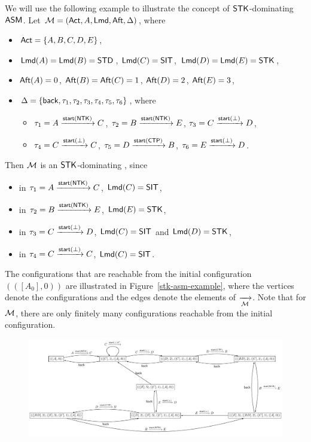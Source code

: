 \begin{example}
We will use the following example to illustrate the concept of $\mathsf{STK}$-dominating $\textsf{ASM}$.
Let ${\mathcal{M} }=({\sf Act},A,{\sf Lmd},{\sf Aft},\Delta)$, where 
\begin{itemize}
\item ${\sf Act} = \{A, B, C, D, E\}$, 
%
\item ${\sf Lmd}(A)={\sf Lmd}(B)={\sf STD}$, ${\sf Lmd}(C) = {\sf SIT}$, ${\sf Lmd}(D) = {\sf Lmd}(E) = {\sf STK}$, 
%
\item ${\sf Aft}(A) = 0$, ${\sf Aft}(B) = {\sf Aft}(C) = 1$, ${\sf Aft}(D) = 2$, ${\sf Aft}(E) = 3$, 
%
\item $\Delta = \{{\mathsf{back} },\tau_1, \tau_2, \tau_3, \tau_4, \tau_5, \tau_6\}$, where 
\begin{itemize}
\item 	$\tau_1 = A \xrightarrow{{\mathsf{start} }({\sf NTK})} C$,
		$\tau_2 = B \xrightarrow{{\mathsf{start} }({\sf NTK})} E$,
		$\tau_3 = C \xrightarrow{{\mathsf{start} }(\bot)} D$,
\item		$\tau_4 = C \xrightarrow{{\mathsf{start} }(\bot)} C$,
		$\tau_5 = D \xrightarrow{{\mathsf{start} }({\sf CTP})} B$,
		$\tau_6 = E \xrightarrow{{\mathsf{start} }(\bot)} D$. 
\end{itemize}
\end{itemize}
Then ${\mathcal{M} }$ is an $\mathsf{STK}$-dominating {\AMASS}, since
\begin{itemize}
\item in $\tau_1 = A \xrightarrow{{\mathsf{start} }({\sf NTK})} C$, ${\sf Lmd}(C) = {\sf SIT}$,  
%
\item in $\tau_2 = B \xrightarrow{{\mathsf{start} }({\sf NTK})} E$, ${\sf Lmd}(E) = {\sf STK}$, 
%
\item in $\tau_3 = C \xrightarrow{{\mathsf{start} }(\bot)} D$, ${\sf Lmd}(C) = {\sf SIT}$ and ${\sf Lmd}(D) = {\sf STK}$, 
%
\item in $\tau_4 = C \xrightarrow{{\mathsf{start} }(\bot)} C$, ${\sf Lmd}(C) = {\sf SIT}$. 
\end{itemize}
The configurations that are reachable from the initial configuration $(([A_0], 0))$ are illustrated in Figure~\ref{stk-asm-example}, where the vertices denote the configurations and the edges denote the elements of $\xrightarrow[{\mathcal{M} }]{}$. 
	Note that for ${\mathcal{M} }$, there are only finitely many configurations reachable from the initial configuration.  
	\begin{figure}[htbp]
			\centering
			\includegraphics[scale = 0.5]{stk-asm-example.pdf}

\end{figure}
\end{example}
